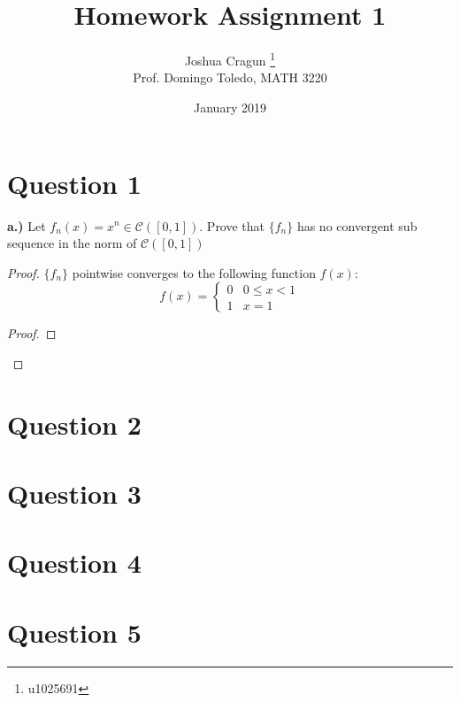 \documentclass[12pt, letterpaper]{article}
\title{Homework Assignment 1}
\author{Joshua Cragun \thanks{u1025691} \\ Prof. Domingo Toledo, MATH 3220}
\date{January 2019}
\begin{document}
\begin{titlepage}
\maketitle
\end{titlepage}

\section*{Question 1}
\noindent\textbf{a.)} Let $f_n(x) = x^n \in \mathcal{C}([0,1])$. Prove that $\{f_n\}$ has no convergent sub sequence in the norm of $\mathcal{C}([0,1])$

\begin{proof}
  $\{f_n\}$ pointwise converges to the following function $f(x)$:
  \[
  f(x) =
  \begin{cases}
      0 & 0 \leq x < 1 \\
      1 & x = 1
   \end{cases}
  \]
  \begin{proof}

  \end{proof}
\end{proof}
\section*{Question 2}
\section*{Question 3}
\section*{Question 4}
\section*{Question 5}
\end{document}
